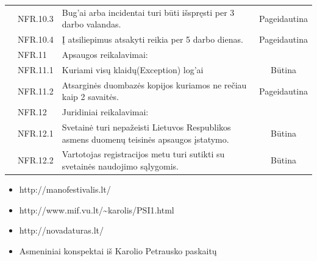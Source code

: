 \documentclass{VUMIFPSkursinis}
\begin{document}
\begin{longtable}{|p{1cm}|p{3cm}|p{9cm}|c|}
 & NFR.10.3 & Bug'ai arba incidentai turi būti išspręsti per 3 darbo valandas. & Pageidautina \\ \cline{2-4} 
 & NFR.10.4 & Į atsiliepimus atsakyti reikia per 5 darbo dienas. & Pageidautina \\ \cline{2-4}
 & \cellcolor{light-gray} NFR.11 & \multicolumn{2}{l|}{ \cellcolor{light-gray}Apsaugos reikalavimai:} \\ \cline{2-4}
 & NFR.11.1 & Kuriami visų klaidų(Exception) log'ai & Būtina \\ \cline{2-4} 
 & NFR.11.2 & Atsarginės duombazės kopijos kuriamos ne rečiau kaip 2 savaitės. & Pageidautina \\ \cline{2-4} 
 &  \cellcolor{light-gray}NFR.12 & \multicolumn{2}{l|}{ \cellcolor{light-gray}Juridiniai reikalavimai:} \\ \cline{2-4} 
 & NFR.12.1 & Svetainė turi nepažeisti Lietuvos Respublikos asmens duomenų teisinės apsaugos įstatymo. & Būtina \\ \cline{2-4} 
 & NFR.12.2 & Vartotojas registracijos metu turi sutikti su svetainės naudojimo sąlygomis. & Būtina \\ \hline

\end{longtable}

\begin{itemize}
\item http://manofestivalis.lt/
\item http://www.mif.vu.lt/\textasciitilde karolis/PSI1.html
\item http://novadaturas.lt/
\item Asmeniniai konspektai iš Karolio Petrausko paskaitų
\end{itemize}

\appendix
\end{document}

